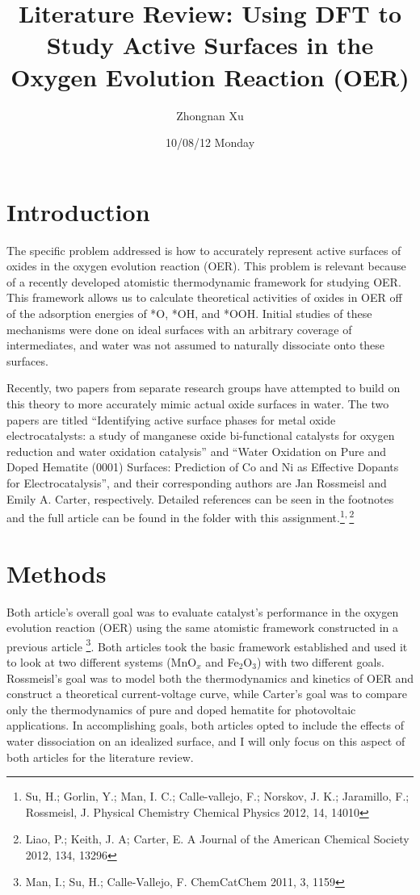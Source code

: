 \documentclass[11pt]{article}
\title{Literature Review: Using DFT to Study Active Surfaces in the Oxygen Evolution Reaction (OER)}
\author{Zhongnan Xu}
\date{10/08/12 Monday}
\begin{document}
\maketitle



\section{Introduction}
\label{sec-1}

  The specific problem addressed is how to accurately represent active
  surfaces of oxides in the oxygen evolution reaction (OER).
  This problem is relevant because of a recently developed atomistic 
  thermodynamic framework for studying OER.
  This framework allows us to calculate theoretical activities of oxides in 
  OER off of the adsorption energies of *O, *OH, and *OOH. 
  Initial studies of these mechanisms were done on ideal surfaces with
  an arbitrary coverage of intermediates, and water was not assumed to
  naturally dissociate onto these surfaces.
  
  Recently, two papers from separate research groups have attempted to
  build on this theory to more accurately mimic actual oxide surfaces
  in water.
  The two papers are titled ``Identifying active surface phases for metal oxide
  electrocatalysts: a study of manganese oxide bi-functional catalysts
  for oxygen reduction and water oxidation catalysis'' and ``Water
  Oxidation on Pure and Doped Hematite (0001) Surfaces: Prediction of Co
  and Ni as Effective Dopants for Electrocatalysis'', and their
  corresponding authors are Jan Rossmeisl and Emily A. Carter,
  respectively.
  Detailed references can be seen in the footnotes and the full article
  can be found in the folder with this assignment.\footnote{Su, H.; Gorlin, Y.; Man, I. C.; Calle-vallejo, F.; Norskov, J. K.;
Jaramillo, F.; Rossmeisl, J. Physical Chemistry Chemical Physics 2012,
14, 14010
 }\textsuperscript{,}\,\footnote{Liao, P.; Keith, J. A; Carter, E. A Journal of the American Chemical
Society 2012, 134, 13296
 }
  
\section{Methods}
\label{sec-2}

  Both article's overall goal was to evaluate catalyst's performance in
  the oxygen evolution reaction (OER) using the same atomistic framework
  constructed in a previous article \footnote{Man, I.; Su, H.; Calle-Vallejo, F. ChemCatChem 2011, 3, 1159
 }.
  Both articles took the basic framework established and used it to
  look at two different systems (MnO$_{x}$ and Fe$_{2}$O$_{3}$) with two
  different goals.
  Rossmeisl's goal was to model both the thermodynamics and
  kinetics of OER and construct a theoretical current-voltage curve,
  while Carter's goal was to compare only the thermodynamics of pure and
  doped hematite for photovoltaic applications.
  In accomplishing goals, both articles opted to include the effects
  of water dissociation on an idealized surface, and I will only focus
  on this aspect of both articles for the literature review. 
\end{document}
